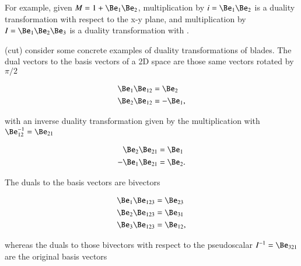 %
%


For example, given \( M = 1 + \Be_1 \Be_2 \), multiplication by \( i = \Be_1 \Be_2 \) is a duality transformation with respect to the x-y plane, and multiplication by \( I = \Be_1 \Be_2 \Be_3 \) is a duality transformation with .

(cut)
consider some concrete examples of duality transformations of blades.
The dual vectors to the basis vectors of a 2D space are those same vectors rotated by \( \pi/2 \)

\begin{dmath}\label{eqn:definitions:360}
\begin{aligned}
\Be_1 \Be_{12} &= \Be_2 \\
\Be_2 \Be_{12} &= -\Be_1,
\end{aligned}
\end{dmath}

with an inverse duality transformation given by the multiplication with \( \Be_{12}^{-1} = \Be_{21} \)

\begin{dmath}\label{eqn:definitions:440}
\begin{aligned}
\Be_2 \Be_{21} &= \Be_1 \\
-\Be_1 \Be_{21} &= \Be_2.
\end{aligned}
\end{dmath}

The  duals to the basis vectors are bivectors

\begin{dmath}\label{eqn:definitions:380}
\begin{aligned}
\Be_1 \Be_{123} &= \Be_{23} \\
\Be_2 \Be_{123} &= \Be_{31} \\
\Be_3 \Be_{123} &= \Be_{12},
\end{aligned}
\end{dmath}

whereas the duals to those bivectors with respect to the pseudoscalar \( I^{-1} = \Be_{321} \) are the original basis vectors


